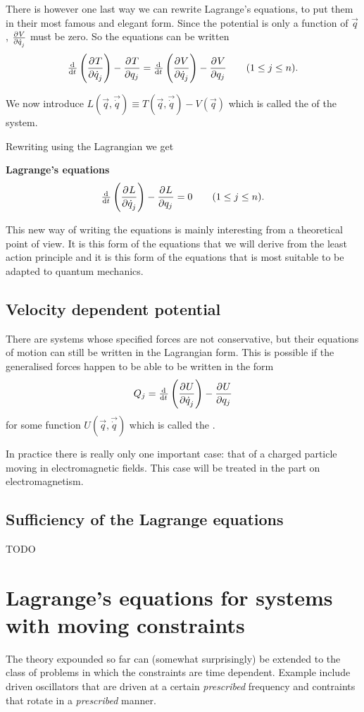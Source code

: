 There is however one last way we can rewrite Lagrange's equations, to put them in their most famous and elegant form. Since the potential is only a function of $\vec{q}$, $ \frac{\partial{^{}}V}{\partial{{\dot{q}_j}^{}}} $ must be zero. So the equations can be written
\[ \od{}{t}\left(\pd{T}{\dot{q}_j}\right) - \pd{T}{q_j} = \od{}{t}\left(\pd{V}{\dot{q}_j}\right) - \pd{V}{q_j} \qquad (1\leq j \leq n). \]

We now introduce $L(\vec{q}, \vec{\dot{q}}) \equiv T(\vec{q}, \vec{\dot{q}}) - V(\vec{q})$ which is called the  of the system.

Rewriting using the Lagrangian we get
\begin{eigenschap}
\textbf{Lagrange's equations}
\[ \od{}{t}\left(\pd{L}{\dot{q}_j}\right) - \pd{L}{q_j} = 0 \qquad (1\leq j \leq n). \]
\end{eigenschap}
This new way of writing the equations is mainly interesting from a theoretical point of view. It is this form of the equations that we will derive from the least action principle and it is this form of the equations that is most suitable to be adapted to quantum mechanics.


\subsection{Velocity dependent potential}
There are systems whose specified forces are not conservative, but their equations of motion can still be written in the Lagrangian form. This is possible if the generalised forces happen to be able to be written in the form
\[ Q_j = \od{}{t}\left(\pd{U}{\dot{q}_j}\right) - \pd{U}{q_j} \]
for some function $U(\vec{q}, \vec{\dot{q}})$ which is called the .

In practice there is really only one important case: that of a charged particle moving in electromagnetic fields. This case will be treated in the part on electromagnetism.


\subsection{Sufficiency of the Lagrange equations}
TODO

\section{Lagrange's equations for systems with moving constraints}
The theory expounded so far can (somewhat surprisingly) be extended to the class of problems in which the constraints are time dependent. Example include driven oscillators that are driven at a certain \textit{prescribed} frequency and contraints that rotate in a \textit{prescribed} manner.

